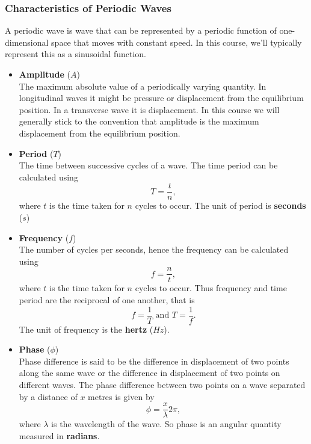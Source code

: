 \subsubsection{Characteristics of Periodic Waves}
A periodic wave is wave that can be represented by a periodic function of one-dimensional space that moves with constant speed. In this course, we'll typically represent this as a sinusoidal function. 
\begin{itemize}
    \item \textbf{Amplitude} ($A$) \\
    The maximum absolute value of a periodically varying quantity. In longitudinal waves it might be pressure or displacement from the equilibrium position. In a transverse wave it is displacement. In this course we will generally stick to the convention that amplitude is the maximum displacement from the equilibrium position.
    \item \textbf{Period} ($T$) \\
    The time between successive cycles of a wave. The time period can be calculated using 
    \begin{equation}
        T = \frac{t}{n},
    \end{equation}
    where $t$ is the time taken for $n$ cycles to occur. The unit of period is \textbf{seconds} ($s$)
    \item \textbf{Frequency} ($f$) \\
    The number of cycles per seconds, hence the frequency can be calculated using
    \begin{equation}
        f = \frac{n}{t},
    \end{equation}
    where $t$ is the time taken for $n$ cycles to occur. Thus frequency and time period are the reciprocal of one another, that is
    \begin{equation}
        f = \frac{1}{T} \text{ and } T = \frac{1}{f}.
    \end{equation}
    The unit of frequency is the \textbf{hertz} ($Hz$).
    \item \textbf{Phase} ($\phi$) \\
    Phase difference is said to be the difference in displacement of two points along the same wave or the difference in displacement of two points on different waves. The phase difference between two points on a wave separated by a distance of $x$ metres is given by 
    \begin{equation}
        \phi = \frac{x}{\lambda} 2\pi,
    \end{equation}
    where $\lambda$ is the wavelength of the wave. So phase is an angular quantity measured in \textbf{radians}.
    

\end{itemize}
